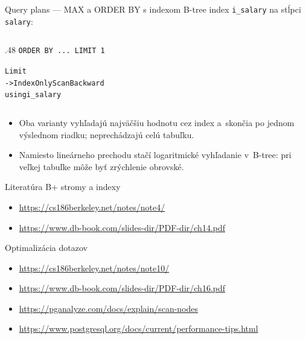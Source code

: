 \documentclass[12pt]{beamer}
\begin{document}
\begin{frame}[fragile]{Query plans --- MAX a ORDER BY s indexom}
B-tree index \texttt{i\_salary} na stĺpci \texttt{salary}:

\bigskip

\begin{columns}[T]
\begin{column}{.48\textwidth}
\footnotesize\texttt{ORDER BY ... LIMIT 1}
\scriptsize
\begin{alltt}
Limit
  -> Index Only Scan Backward
       using i_salary
\end{alltt}
\end{column}
\end{columns}

\bigskip

\begin{itemize}
\item Oba varianty vyhľadajú najväčšiu hodnotu cez index
  a~skončia po jednom výslednom riadku; neprechádzajú celú tabuľku.
\item Namiesto lineárneho prechodu stačí logaritmické vyhľadanie v~B-tree:
  pri veľkej tabuľke môže byť \alert{zrýchlenie obrovské}.
\end{itemize}
\end{frame}

\begin{frame}{Literatúra}
B+ stromy a indexy
\begin{itemize}
\item {\scriptsize\url{https://cs186berkeley.net/notes/note4/}}
\item {\scriptsize\url{https://www.db-book.com/slides-dir/PDF-dir/ch14.pdf}}
\end{itemize}
\bigskip

Optimalizácia dotazov
\begin{itemize}
\item {\scriptsize\url{https://cs186berkeley.net/notes/note10/}}
\item {\scriptsize\url{https://www.db-book.com/slides-dir/PDF-dir/ch16.pdf}}
\item {\scriptsize\url{https://pganalyze.com/docs/explain/scan-nodes}}
\item {\scriptsize\url{https://www.postgresql.org/docs/current/performance-tips.html}}
\end{itemize}
\end{frame}
\end{document}
